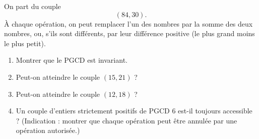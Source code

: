 On part du couple
\[
(84, 30).
\]
À chaque opération, on peut remplacer l'un des nombres par la somme des deux
nombres, ou, s'ils sont différents, par leur différence positive (le plus grand
moins le plus petit).
\begin{enumerate}
  \item Montrer que le PGCD est invariant.
  \item Peut-on atteindre le couple $(15, 21)$ ?
  \item Peut-on atteindre le couple $(12, 18)$ ?
  \item Un couple d'entiers strictement positifs de PGCD $6$ est-il toujours
  accessible ? (Indication : montrer que chaque opération peut être annulée par
  une opération autorisée.)
\end{enumerate}
